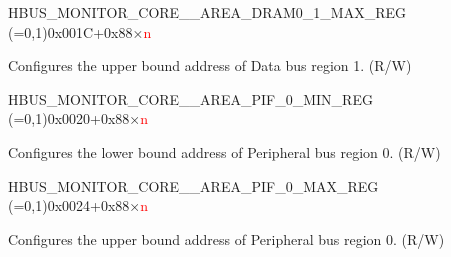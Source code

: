 \begin{register}{H}{BUS\_MONITOR\_CORE\_\_AREA\_DRAM0\_1\_MAX\_REG (=0,1)}{0x001C+0x88×\textcolor{red}{n}}\label{regdesc:BUSMONITORCORE0AREADRAM01MAXREG}
%
\regnewline%
\begin{regdesc}\begin{reglist}
\label{fielddesc:BUSMONITORCORE0AREADRAM01MAX}\item [BUS\_MONITOR\_CORE\_\regindex{n}\_AREA\_DRAM0\_1\_MAX] Configures the upper bound address of Data bus region 1. (R/W)
\end{reglist}\end{regdesc}
\end{register}


\begin{register}{H}{BUS\_MONITOR\_CORE\_\_AREA\_PIF\_0\_MIN\_REG (=0,1)}{0x0020+0x88×\textcolor{red}{n}}\label{regdesc:BUSMONITORCORE0AREAPIF0MINREG}
%
\regnewline%
\begin{regdesc}\begin{reglist}
\label{fielddesc:BUSMONITORCORE0AREAPIF0MIN}\item [BUS\_MONITOR\_CORE\_\regindex{n}\_AREA\_PIF\_0\_MIN] Configures the lower bound address of Peripheral bus region 0. (R/W)
\end{reglist}\end{regdesc}
\end{register}


\begin{register}{H}{BUS\_MONITOR\_CORE\_\_AREA\_PIF\_0\_MAX\_REG (=0,1)}{0x0024+0x88×\textcolor{red}{n}}\label{regdesc:BUSMONITORCORE0AREAPIF0MAXREG}
%
\regnewline%
\begin{regdesc}\begin{reglist}
\label{fielddesc:BUSMONITORCORE0AREAPIF0MAX}\item [BUS\_MONITOR\_CORE\_\regindex{n}\_AREA\_PIF\_0\_MAX] Configures the upper bound address of Peripheral bus region 0. (R/W)
\end{reglist}\end{regdesc}
\end{register}


